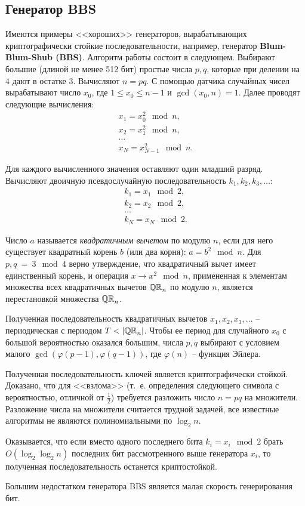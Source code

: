 \subsection{Генератор BBS}

Имеются примеры <<хороших>> генераторов, вырабатывающих криптографически стойкие последовательности, например, генератор \textbf{Blum-Blum-Shub (BBS)}. Алгоритм работы состоит в следующем. Выбирают большие (длиной не менее 512 бит) простые числа $p, q$, которые при делении на $4$ дают в остатке $3$. Вычисляют $n = p q$. С помощью датчика случайных чисел вырабатывают число $x_{0}$, где $1 \leq x_0 \leq n-1$ и $\gcd(x_0, n) = 1$. Далее проводят следующие вычисления:
\[ \begin{array}{l}
        x_{1} = x_{0}^{2} \mod n,\\
        x_{2} = x_{1}^{2} \mod n,\\
        \dots\\
        x_{N} = x_{N-1}^{2} \mod n.
\end{array} \]

Для каждого вычисленного значения оставляют один младший разряд. Вычисляют двоичную псевдослучайную последовательность $k_1, k_2, k_3, \dots$:
\[ \begin{array}{l}
        k_{1} = x_{1} \mod 2,\\
        k_{2} = x_{2} \mod 2,\\
        \dots \\
        k_{N} = x_{N} \mod 2.
\end{array} \]

Число $a$ называется \emph{квадратичным вычетом} по модулю $n$, если для него существует квадратный корень $b$ (или два корня): $a = b^2 \mod n$. Для $p,q ~=~ 3 \mod 4$ верно утверждение, что квадратичный вычет имеет единственный корень, и операция $x \rightarrow x^2 \mod n$, примененная к элементам множества всех квадратичных вычетов $\mathbb{QR}_n$ по модулю $n$, является перестановкой множества $\mathbb{QR}_n$.

Полученная последовательность квадратичных вычетов $x_1, x_2, x_3, \dots$ -- периодическая с периодом $T < |\mathbb{QR}_n|$. Чтобы ее период для случайного $x_0$ с большой вероятностью оказался большим, числа $p,q$ выбирают с условием малого $\gcd(\varphi(p-1), \varphi(q-1))$, где $\varphi(n)$ -- функция Эйлера.

Полученная последовательность ключей является криптографически стойкой. Доказано, что для <<взлома>> (т.~е. определения следующего символа с вероятностью, отличной от $\frac{1}{2}$) требуется разложить число $n=pq$ на множители. Разложение числа на множители считается трудной задачей, все известные алгоритмы не являются полиномиальными по $\log_2 n$.

Оказывается, что если вместо одного последнего бита $k_i = x_i \mod 2$ брать $O(\log_2 \log_2 n)$ последних бит рассмотренного выше генератора $x_i$, то полученная последовательность останется криптостойкой.

Большим недостатком генератора BBS является малая скорость генерирования бит.
